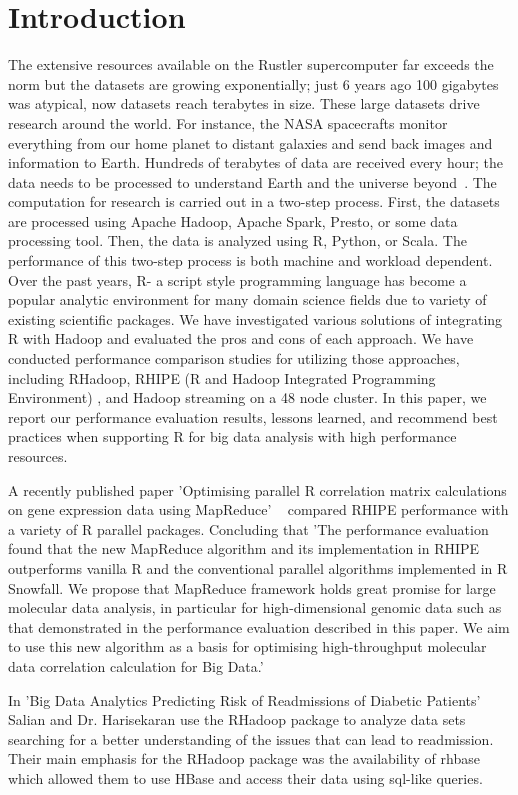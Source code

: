 \documentclass[
journal=jacsat, %
manuscript=article]{achemso}
\begin{document}
\section{Introduction}
The extensive resources available on the Rustler supercomputer far exceeds the norm but the datasets are growing exponentially; just 6 years ago 100 gigabytes was atypical, now datasets reach terabytes in size. These large datasets drive research around the world. For instance, the NASA spacecrafts monitor everything from our home planet to distant galaxies and send back images and information to Earth. Hundreds of terabytes of data are received every hour; the data needs to be processed to understand Earth and the universe beyond~\citep{JPL}. The computation for research is carried out in a two-step process. First, the datasets are processed using Apache Hadoop, Apache Spark, Presto, or some data processing tool. Then, the data is analyzed using R, Python, or Scala. The performance of this two-step process is both machine and workload dependent. Over the past years, R- a script style programming language has become a popular analytic environment for many domain science fields due to variety of existing scientific packages. We have investigated various solutions of integrating R with Hadoop and evaluated the pros and cons of each approach. We have conducted performance comparison studies for utilizing those approaches, including RHadoop, RHIPE (R and Hadoop Integrated Programming Environment) , and Hadoop streaming on a 48 node cluster. In this paper, we report our performance evaluation results, lessons learned, and recommend best practices when supporting R for big data analysis with high performance resources.    

A recently published paper 'Optimising parallel R correlation matrix calculations on gene expression data using MapReduce' ~\citep{BIO} compared RHIPE performance with a variety of R parallel packages. Concluding that 'The performance evaluation found that the new MapReduce algorithm and its implementation in RHIPE outperforms vanilla R and the conventional parallel algorithms implemented in R Snowfall. We propose that MapReduce framework holds great promise for large molecular data analysis, in particular for high-dimensional genomic data such as that demonstrated in the performance evaluation described in this paper. We aim to use this new algorithm as a basis for optimising high-throughput molecular data correlation calculation for Big Data.'

In 'Big Data Analytics Predicting Risk of Readmissions of Diabetic Patients'~\cite{DIAB} Salian and Dr. Harisekaran use the RHadoop package to analyze data sets searching for a better understanding of the issues that can lead to readmission. Their main emphasis for the RHadoop package was the availability of rhbase which allowed them to use HBase and access their data using sql-like queries. 
\end{document}

